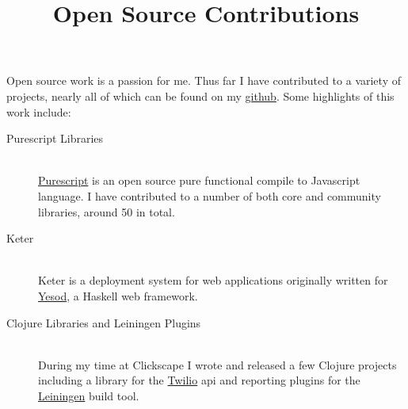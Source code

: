 \documentclass[margintitle,line]{res}
\begin{document}
\begin{resume}
\title{Open Source Contributions}
\begin{position}
Open source work is a passion for me. Thus far I have contributed to a variety
of projects, nearly all of which can be found on my
\href{http://github.com/telser}{github}. Some highlights of this work include:
\begin{description}
\item[Purescript Libraries] \hfill \\
  \href{http://www.purescript.org/}{Purescript} is an
  open source pure functional compile to Javascript language. I have contributed
  to a number of both core and community libraries, around 50 in total.
\item[Keter] \hfill \\
  Keter is a deployment system for web applications originally
  written for \href{http://www.yesodweb.com/}{Yesod}, a Haskell web framework.
\item[Clojure Libraries and Leiningen Plugins] \hfill \\
  During my time at Clickscape I wrote and released a few Clojure projects
  including a library for the \href{https://www.twilio.com/}{Twilio} api and
  reporting plugins for the \href{http://leiningen.org/}{Leiningen} build tool.
\end{description}
\end{position}




\end{resume}
\end{document}
